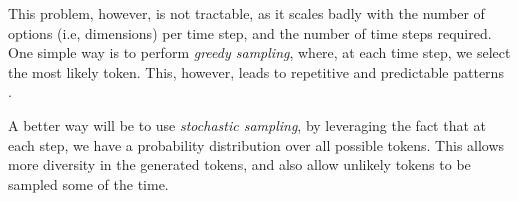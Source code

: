 
\par This problem, however, is not tractable, as it scales badly with the number of options (i.e, dimensions) per time step, and the number of time steps required. One simple way is to perform \textit{greedy sampling}, where, at each time step, we select the most likely token. This, however, leads to repetitive and predictable patterns \citep{chollet2017book}.

\par A better way will be to use \textit{stochastic sampling}, by leveraging the fact that at each step, we have a probability distribution over all possible tokens. This allows more diversity in the generated tokens, and also allow unlikely tokens to be sampled some of the time.

